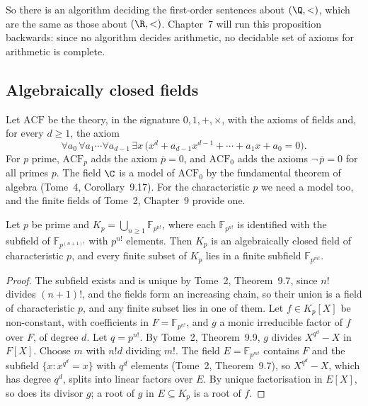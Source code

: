 So there is an algorithm deciding the first-order sentences about $(\Q,<)$, which are the same as those about $(\R,<)$. Chapter~7 will run this proposition backwards: since no algorithm decides arithmetic, no decidable set of axioms for arithmetic is complete.

\subsection*{Algebraically closed fields}

Let $\mathrm{ACF}$ be the theory, in the signature $0,1,+,\times$, with the axioms of fields and, for every $d\ge1$, the axiom
\[
\forall a_0\,\forall a_1\cdots\forall a_{d-1}\,\exists x\,\bigl(x^d+a_{d-1}x^{d-1}+\cdots+a_1x+a_0=0\bigr).
\]
For $p$ prime, $\mathrm{ACF}_p$ adds the axiom $\overline p=0$, and $\mathrm{ACF}_0$ adds the axioms $\neg\,\overline p=0$ for all primes $p$. The field $\C$ is a model of $\mathrm{ACF}_0$ by the fundamental theorem of algebra (Tome~4, Corollary~9.17). For the characteristic $p$ we need a model too, and the finite fields of Tome~2, Chapter~9 provide one.

\begin{lemma}\label{lem:kp}
Let $p$ be prime and $K_p=\bigcup_{n\ge1}\mathbb F_{p^{n!}}$, where each $\mathbb F_{p^{n!}}$ is identified with the subfield of $\mathbb F_{p^{(n+1)!}}$ with $p^{n!}$ elements. Then $K_p$ is an algebraically closed field of characteristic $p$, and every finite subset of $K_p$ lies in a finite subfield $\mathbb F_{p^{m!}}$.
\end{lemma}

\begin{proof}
The subfield exists and is unique by Tome~2, Theorem~9.7, since $n!$ divides $(n+1)!$, and the fields form an increasing chain, so their union is a field of characteristic $p$, and any finite subset lies in one of them. Let $f\in K_p[X]$ be non-constant, with coefficients in $F=\mathbb F_{p^{n!}}$, and $g$ a monic irreducible factor of $f$ over $F$, of degree $d$. Let $q=p^{n!}$. By Tome~2, Theorem~9.9, $g$ divides $X^{q^d}-X$ in $F[X]$. Choose $m$ with $n!d$ dividing $m!$. The field $E=\mathbb F_{p^{m!}}$ contains $F$ and the subfield $\{x:x^{q^d}=x\}$ with $q^d$ elements (Tome~2, Theorem~9.7), so $X^{q^d}-X$, which has degree $q^d$, splits into linear factors over $E$. By unique factorisation in $E[X]$, so does its divisor $g$; a root of $g$ in $E\subseteq K_p$ is a root of $f$.
\end{proof}

